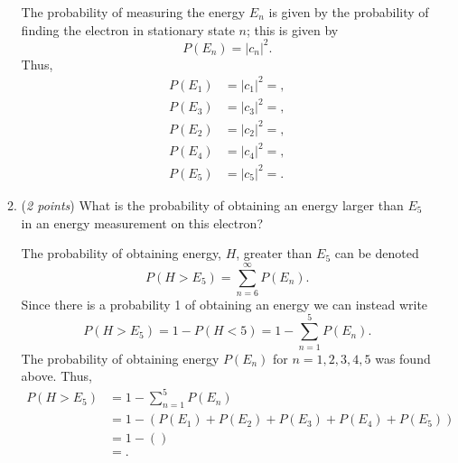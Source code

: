 \documentclass[a4paper, 12pt]{config/homework}
\begin{document}
\begin{enumerate}
\begin{enumerate}[label=(\alph*)]
The probability of measuring the energy \(E_n\) is given by the probability of finding the electron in stationary state \(n\); this is given by
\[P(E_n) = \left|c_n\right|^2.\]
Thus,
\begin{align*}
P(E_1) &= \left|c_1\right|^2 = ,
\\P(E_3) &= \left|c_3\right|^2 = ,
\\P(E_2) &= \left|c_2\right|^2 = ,
\\P(E_4) &= \left|c_4\right|^2 = ,
\\P(E_5) &= \left|c_5\right|^2 = .
\end{align*}

\item (\textit{2 points}) What is the probability of obtaining an energy larger than \(E_5\) in an energy measurement on this electron?

The probability of obtaining energy, \(H\), greater than \(E_5\) can be denoted
\[P(H > E_5) = \sum_{n=6}^{\infty}{P(E_n)}.\]
Since there is a probability 1 of obtaining an energy we can instead write
\[P(H > E_5) = 1 - P(H < 5) = 1 - \sum_{n=1}^{5}{P(E_n)}.\]
The probability of obtaining energy \(P(E_n)\) for \(n=1,2,3,4,5\) was found above. Thus,
\begin{align*}
P(H > E_5) &= 1 - \sum_{n=1}^{5}{P(E_n)}
\\&= 1 - \left(P(E_1) + P(E_2) + P(E_3) + P(E_4) + P(E_5)\right)
\\&= 1 - \left(  \right)
\\&= .
\end{align*}

\end{enumerate}
\end{enumerate}
\end{document}
